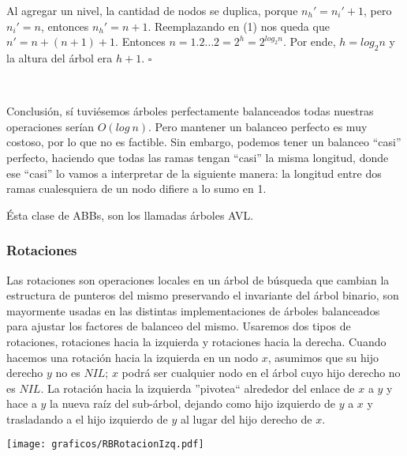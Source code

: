 Al agregar un nivel, la cantidad de nodos se duplica, porque $n_h' = n_i' + 1$, pero $n_i' = n$, entonces $n_h' = n +1$. Reemplazando en (1) nos queda que $n' = n + (n + 1) + 1$. Entonces $n = 1 $.$ 2 \dots 2 = 2^h = 2^{log_2 n}$.
Por ende, $h = log_2n$ y la altura del \'arbol era $h+1$. $\square$

~

Conclusi\'on, s\'i tuvi\'esemos \'arboles perfectamente balanceados todas nuestras operaciones ser\'ian $O(log\ n)$. Pero mantener un balanceo perfecto es muy costoso, por lo que no es factible.
Sin embargo, podemos tener un balanceo ``casi'' perfecto, haciendo que todas las ramas tengan ``casi'' la misma longitud, donde ese ``casi'' lo vamos a interpretar de la siguiente manera: la longitud entre dos ramas cualesquiera de un nodo difiere a lo sumo en 1.

\'Esta clase de ABBs, son los llamadas \'arboles AVL.

\subsubsection{Rotaciones}

Las rotaciones son operaciones locales en un \'arbol de b\'usqueda que cambian la estructura de punteros del mismo preservando el invariante del \'arbol binario, son mayormente usadas en las distintas implementaciones de \'arboles balanceados para ajustar los factores de balanceo del mismo. Usaremos dos tipos de rotaciones, rotaciones hacia la izquierda y rotaciones hacia la derecha. Cuando hacemos una rotaci\'on hacia la izquierda en un nodo $x$, asumimos que su hijo derecho $y$ no es $NIL$; $x$ podr\'a ser cualquier nodo en el \'arbol cuyo hijo derecho no es $NIL$. La rotaci\'on hacia la izquierda ''pivotea`` alrededor del enlace de $x$ a $y$ y hace a $y$ la nueva ra\'iz del sub-\'arbol, dejando como hijo izquierdo de $y$ a $x$ y trasladando a el hijo izquierdo de $y$ al lugar del hijo derecho de $x$. 

\begin{SCfigure}[1][ht!]
 \centering
 \texttt{[image: graficos/RBRotacionIzq.pdf]}
 \caption*{\newline \footnotesize Si nos imaginamos la rotaci\'on como bolillas e hilos, ''tirar\'iamos`` $y$ hacia arriba a la izquierda, haciendo que $x$ baje y quede a la altura del hijo izquierdo de $y$. Luego, como el hijo izquierdo de $y$ se encontraba en el sub-\'arbol derecho de $x$, sera mas grande que $x$, por lo que lo podremos asignar como hijo derecho de $x$.}
\end{SCfigure}

